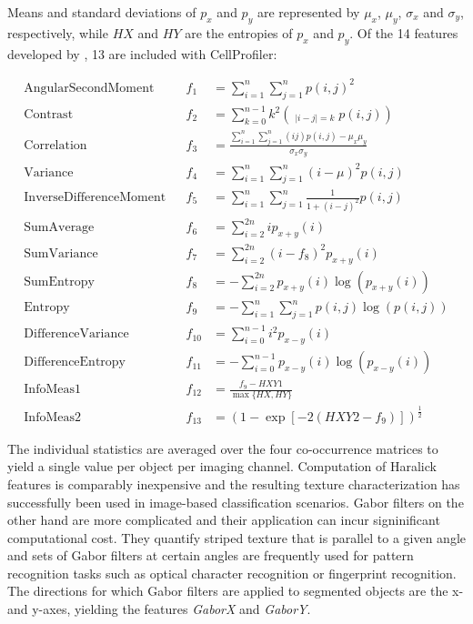 Means and standard deviations of $p_x$ and $p_y$ are represented by $\mu_x$, $\mu_y$, $\sigma_x$ and $\sigma_y$, respectively, while $HX$ and $HY$ are the entropies of $p_x$ and $p_y$. Of the 14 features developed by  \citeauthor{Haralick1973}, 13 are included with CellProfiler:

\begin{align}
\text{AngularSecondMoment} & &
  f_1 &= \sum_{i=1}^n \sum_{j=1}^n p(i,j)^2 \\
\text{Contrast} & &
  f_2 &= \sum_{k=0}^{n-1} k^2 \left(\mathop{\sum_{i=1}^{n}\sum_{j=1}^{n}}_{\lvert i-j\rvert=k} p(i,j)\right) \\
\text{Correlation} & &
  f_3 &= \frac{\sum_{i=1}^n \sum_{j=1}^n (ij) p(i,j)-\mu_x\mu_y}{\sigma_x\sigma_y}\\
\text{Variance} & &
  f_4 &= \sum_{i=1}^n \sum_{j=1}^n (i-\mu)^2 p(i,j)\\
\text{InverseDifferenceMoment} & &
  f_5 &= \sum_{i=1}^n \sum_{j=1}^n \frac{1}{1+(i-j)^2} p(i,j)\\
\text{SumAverage} & &
  f_6 &= \sum_{i=2}^{2n} i p_{x+y}(i)\\
\text{SumVariance} & &
  f_7 &= \sum_{i=2}^{2n} (i-f_8)^2 p_{x+y}(i)\\
\text{SumEntropy} & &
  f_8 &= -\sum_{i=2}^{2n} p_{x+y}(i) \log\left(p_{x+y}(i)\right)\\
\text{Entropy} & &
  f_9 &= -\sum_{i=1}^n \sum_{j=1}^n p(i,j) \log\left(p(i,j)\right)\\
\text{DifferenceVariance} & &
  f_{10} &= \sum_{i=0}^{n-1} i^2 p_{x-y}(i)\\
\text{DifferenceEntropy} & &
  f_{11} &= -\sum_{i=0}^{n-1} p_{x-y}(i) \log\left(p_{x-y}(i)\right)\\
\text{InfoMeas1} & &
  f_{12} &= \frac{f_9-HXY1}{\max\{HX,HY\}}\\
\text{InfoMeas2} & &
  f_{13} &= \left(1-\exp\left[-2(HXY2-f_9)\right]\right)^{\frac{1}{2}}
\end{align}

The individual statistics are averaged over the four co-occurrence matrices to yield a single value per object per imaging channel. Computation of Haralick features is comparably inexpensive and the resulting texture characterization has successfully been used in image-based classification scenarios. Gabor filters on the other hand are more complicated and their application can incur signinificant computational cost. They quantify striped texture that is parallel to a given angle and sets of Gabor filters at certain angles are frequently used for pattern recognition tasks such as optical character recognition or fingerprint recognition. The directions for which Gabor filters are applied to segmented objects are the x- and y-axes, yielding the features \textit{GaborX} and \textit{GaborY}.

